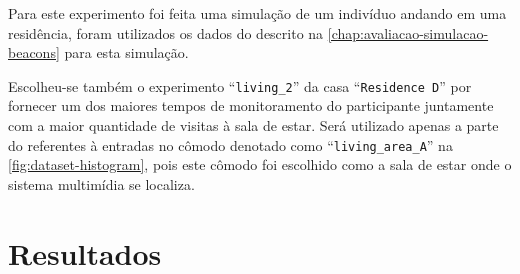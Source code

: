 Para este experimento foi feita uma simulação de um indivíduo andando em uma residência, foram utilizados os dados do \dataset{} descrito na \autoref{chap:avaliacao-simulacao-beacons} para esta simulação.

Escolheu-se também o experimento ``\texttt{living\_2}'' da casa ``\texttt{Residence D}'' por fornecer um dos maiores tempos de monitoramento do participante juntamente com a maior quantidade de visitas à sala de estar. Será utilizado apenas a parte do \dataset{} referentes à entradas no cômodo denotado como ``\texttt{living\_area\_A}'' na \autoref{fig:dataset-histogram}, pois este cômodo foi escolhido como a sala de estar onde o sistema multimídia se localiza.

\section{Resultados}

\begin{table}[htb]
	\begin{center}
	\end{center}
\end{table}


\begin{table}[htb]
	\begin{center}
	\end{center}
\end{table}

